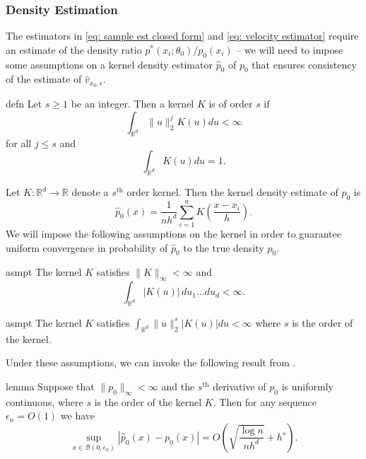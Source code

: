 \documentclass[11pt]{article}
\begin{document}
\subsubsection{Density Estimation}
The estimators in \cref{eq: sample est closed form} and \cref{eq: velocity estimator} require an estimate of the density ratio $p^*(x_i;\theta_0)/p_0(x_i)$ -- we will need to impose some assumptions on a kernel density estimator $\hat{p}_0$ of $p_0$ that ensures consistency of the estimate of $\hat{v}_{x_0, \epsilon}$. 

\begin{restatable}{defn}{}
    Let $s \geq 1$ be an integer. Then a kernel $K$ is of order $s$ if 
    \[\int_{\mathbb{R}^d}\|u\|_2^jK(u)du < \infty\]
    for all $j \leq s$ and 
    \[\int_{\mathbb{R}^d}K(u)du = 1.\]
\end{restatable}

Let $K:\mathbb{R}^d \rightarrow \mathbb{R}$ denote a $s^{\text{th}}$ order kernel. Then the kernel density estimate of $p_0$ is
\begin{equation}
    \hat{p}_0(x) = \frac{1}{nh^d}\sum_{i = 1}^nK\left(\frac{x -x_i}{h}\right). \label{eq: kde}
\end{equation}
We will impose the following assumptions on the kernel in order to guarantee uniform convergence in probability of $\hat{p}_0$ to the true density $p_0$.


\begin{restatable}{asmpt}{} \label{assumption: boundedness and integrability}
    The kernel $K$ satisfies $\|K\|_{\infty} < \infty$ and 
    \[\int_{\mathbb{R}^d}|K(u)|\,du_1\dots du_d < \infty.\]
\end{restatable}

\begin{restatable}{asmpt}{} \label{assumption: kernel smoothness}
    The kernel $K$ satisfies $\int_{\mathbb{R}^d}\|u\|_2^s|K(u)|du  < \infty$ where $s$ is the order of the kernel. 
\end{restatable}
Under these assumptions, we can invoke the following result from \citet{hansen2008uniform}.
\begin{restatable}{lemma}{} \label{lemma: uniform convergence of kde}
    Suppose that $\|p_0\|_{\infty}< \infty$ and the $s^{\text{th}}$ derivative of $p_0$ is uniformly continuous, where $s$ is the order of the kernel $K$. Then for any sequence $\epsilon_n  = O(1)$ we have
    \[\sup_{x \in \mathcal{B}(0, \epsilon_n)}\left|\hat{p}_0(x) - p_0(x)\right| = O\left(\sqrt{\frac{\log n}{nh^d}} +h^s \right).\]
\end{restatable}
\end{document}
